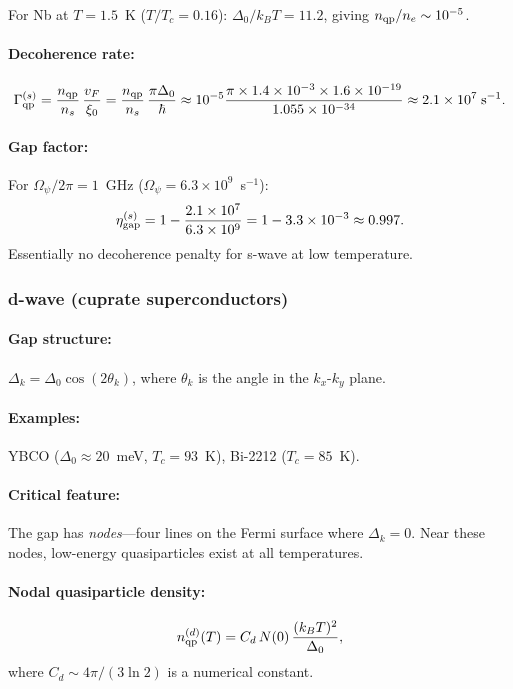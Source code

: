 \documentclass[12pt,aps,prd,twocolumn,superscriptaddress,nofootinbib]{revtex4-2}
\newcommand{\ee}[1]{\times 10^{#1}}
\begin{document}
For Nb at $T = 1.5$~K ($T/T_c = 0.16$): $\Delta_0/k_BT = 11.2$,
giving $n_{\rm qp}/n_e \sim 10^{-5}$.

\paragraph{Decoherence rate:}
\begin{equation}\label{eq:Gamma-qp-swave}
\Gamma_{\rm qp}^{(s)} = \frac{n_{\rm qp}}{n_s}\,\frac{v_F}{\xi_0}
= \frac{n_{\rm qp}}{n_s}\,\frac{\pi\Delta_0}{\hbar}
\approx 10^{-5}\frac{\pi\times1.4\ee{-3}\times1.6\ee{-19}}{1.055\ee{-34}}
\approx 2.1\ee{7}\;\si{s^{-1}}.
\end{equation}

\paragraph{Gap factor:} For $\Omega_\psi/2\pi = 1$~GHz
($\Omega_\psi = 6.3\ee{9}$~s$^{-1}$):
\begin{equation}
\eta_{\rm gap}^{(s)} = 1 - \frac{2.1\ee{7}}{6.3\ee{9}}
= 1 - 3.3\ee{-3} \approx 0.997.
\end{equation}
Essentially no decoherence penalty for s-wave at low temperature.

\subsubsection{d-wave (cuprate superconductors)}

\paragraph{Gap structure:} $\Delta_k = \Delta_0\cos(2\theta_k)$,
where $\theta_k$ is the angle in the $k_x$-$k_y$ plane.

\paragraph{Examples:} YBCO ($\Delta_0 \approx 20$~meV, $T_c = 93$~K),
Bi-2212 ($T_c = 85$~K).

\paragraph{Critical feature:} The gap has \emph{nodes}---four lines
on the Fermi surface where $\Delta_k = 0$. Near these nodes, low-energy
quasiparticles exist at all temperatures.

\paragraph{Nodal quasiparticle density:}
\begin{equation}\label{eq:nqp-dwave}
n_{\rm qp}^{(d)}(T) = C_d\,N(0)\,\frac{(k_BT)^2}{\Delta_0},
\end{equation}
where $C_d \sim 4\pi/(3\ln 2)$ is a numerical constant.
\end{document}

